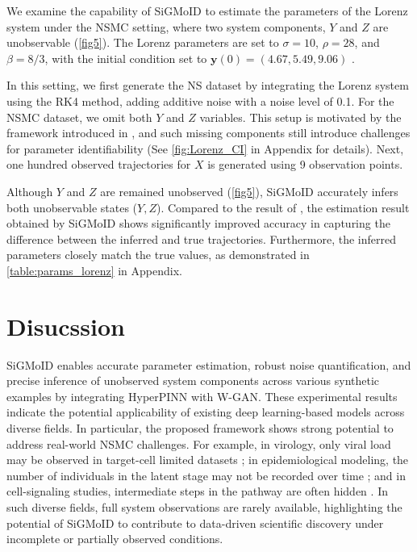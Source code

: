 \documentclass[letterpaper]{article} %
\theoremstyle{thmstyleone}%
\theoremstyle{thmstyletwo}%
\theoremstyle{thmstylethree}%
\begin{document}
We examine the capability of SiGMoID to estimate the parameters of the Lorenz system under the NSMC setting, where two system components, $Y$ and $Z$ are unobservable (\cref{fig5}). The Lorenz parameters are set to $\sigma = 10$, $\rho = 28$, and $\beta = 8/3$, with the initial condition set to $\mathbf{y}(0)=(4.67, 5.49, 9.06)$ \cite{hirsch2013differential}. 

In this setting, we first generate the NS dataset by integrating the Lorenz system using the RK4 method, adding additive noise with a noise level of 0.1. For the NSMC dataset, we omit both $Y$ and $Z$ variables. This setup is motivated by the framework introduced in \cite{stepaniants2024discovering}, and such missing components still introduce challenges for parameter identifiability (See \cref{fig:Lorenz_CI} in Appendix for details). Next, one hundred observed trajectories for $X$ is generated using 9 observation points.

Although $Y$ and $Z$ are remained unobserved (\cref{fig5}), SiGMoID accurately infers both unobservable states ($Y, Z$). Compared to the result of \cite{stepaniants2024discovering}, the estimation result obtained by SiGMoID shows significantly improved accuracy in capturing the difference between the inferred and true trajectories. Furthermore, the inferred parameters closely match the true values, as demonstrated in \cref{table:params_lorenz} in Appendix.

\section*{Disucssion}
SiGMoID enables accurate parameter estimation, robust noise quantification, and precise inference of unobserved system components across various synthetic examples by integrating HyperPINN with W-GAN. These experimental results indicate the potential applicability of existing deep learning-based models across diverse fields. In particular, the proposed framework shows strong potential to address real-world NSMC challenges. For example, in virology, only viral load may be observed in target-cell limited datasets \cite{smith2018influenza}; in epidemiological modeling, the number of individuals in the latent stage may not be recorded over time \cite{hong2024overcoming}; and in cell-signaling studies, intermediate steps in the pathway are often hidden \cite{jo2024density}. In such diverse fields, full system observations are rarely available, highlighting the potential of SiGMoID to contribute to data-driven scientific discovery under incomplete or partially observed conditions.
\end{document}
